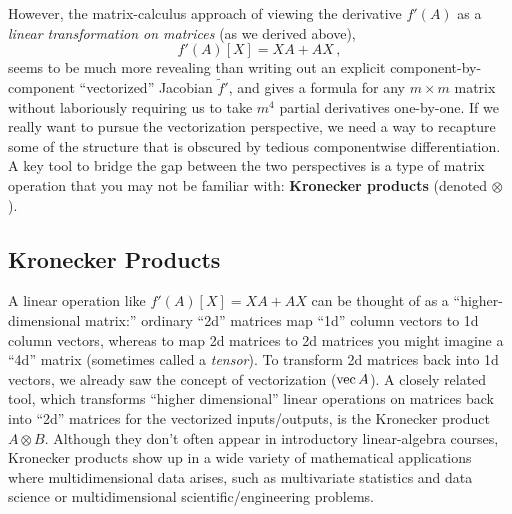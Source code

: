 However, the matrix-calculus approach of viewing the derivative $f'(A)$
as a \emph{linear transformation on matrices} (as we derived above),
\[
f'(A)[X]=XA+AX\,,
\]
seems to be much more revealing than writing out an explicit component-by-component
``vectorized'' Jacobian $\tilde{f}'$, and gives a formula for any
$m\times m$ matrix without   laboriously requiring us to take $m^{4}$ partial
derivatives one-by-one. If we really want to pursue the vectorization perspective,
we need a way to recapture some of the structure that is obscured
by tedious componentwise differentiation. A key tool to bridge the
gap between the two perspectives is a type of matrix operation that
you may not be familiar with: \textbf{Kronecker products} (denoted
$\otimes$).

\subsection{Kronecker Products}

A linear operation like $f'(A)[X]=XA+AX$ can be thought of as a ``higher-dimensional
matrix:'' ordinary ``2d'' matrices map ``1d'' column vectors to 1d
column vectors, whereas to map 2d matrices to 2d matrices you might
imagine a ``4d'' matrix (sometimes called a \emph{tensor}). To transform
2d matrices back into 1d vectors, we already saw the concept of vectorization
($\operatorname{vec} A$). A closely related tool, which transforms ``higher dimensional''
linear operations on matrices back into ``2d'' matrices for the vectorized
inputs/outputs, is the Kronecker product $A\otimes B$. Although they
don't often appear in introductory linear-algebra courses, Kronecker
products show up in a wide variety of mathematical applications where
multidimensional data arises, such as multivariate statistics and
data science or multidimensional scientific/engineering problems.

